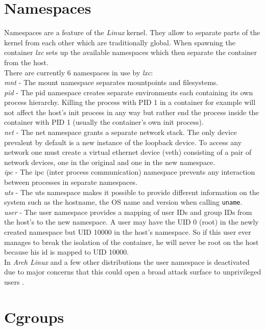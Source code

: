 \section{Namespaces}\label{ns}

Namespaces\cite{namespaces} are a feature of the \textit{Linux} kernel. They allow to separate parts of the kernel from each
other which are traditionally global.
When spawning the container \textit{lxc} sets up the available namespaces which then separate the container from the host.\\
There are currently 6 namespaces in use by \textit{lxc}:\\
\textit{mnt} - The mount namespace separates mountpoints and filesystems.\\
\textit{pid} - The pid namespace creates separate environments each containing its own process hierarchy. Killing the process with PID 1
in a container for example will not affect the host's init process in any way but rather end the process inside the container with PID 1
(usually the container's own init process).\\
\textit{net} - The net namespace grants a separate network stack. The only device prevalent by default is a new instance of the loopback device.
To access any network
one must create a virtual ethernet device (veth) consisting of a pair of network devices, one in the original and one in the new namespace.\\
\textit{ipc} - The ipc (inter process communication) namespace prevents any interaction between processes in separate namespaces.\\
\textit{uts} - The uts namespace makes it possible to provide different information on the system such as the hostname, the OS name and version
when calling \texttt{uname}.\\
\textit{user} - The user namespace provides a mapping of user IDs and group IDs from the host's to the new namespace. A user may have the UID 0
(root) in the newly created namespace but UID 10000 in the host's namespace. So if this user ever manages to break the isolation of the
container, he will never be root on the host because his id is mapped to UID 10000.\\
In \textit{Arch Linux} and a few other distributions the user namespace is deactivated due to major concerns that this could open a broad
attack surface to unprivileged users \cite{archuserns}.

\section{Cgroups}


